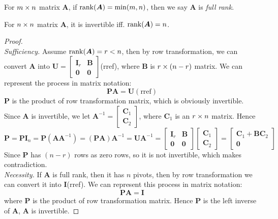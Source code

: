 \begin{definition}
For $m\times n$ matrix $\bm A$, if $\operatorname{rank}(\bm A) = \min(m,n)$, then we say $\bm A$ is \emph{full rank}.
\end{definition}
\begin{theorem}
For $n\times n$ matrix $\bm A$, it is invertible iff. $\operatorname{rank}(\bm A) = n$.
\end{theorem}
\begin{proof}\qquad\\
\textit{Sufficiency.    }Assume $\operatorname{rank}(\bm A)=r<n$, then by row transformation, we can convert $\bm A$ into $\bm U = \begin{bmatrix}
\bm I_{r}&\bm B\\\bm 0&\bm 0
\end{bmatrix}$(rref), where $\bm B$ is $r\times(n-r)$ matrix. We can represent the process in matrix notation:
\[
\bm P\bm A = \bm U(\text{rref})
\]
$\bm P$ is the product of row transformation matrix, which is obviously invertible.\\
Since $\bm A$ is invertible, we let $\bm A^{-1} = \begin{bmatrix}
\bm C_{1}\\\bm C_{2}
\end{bmatrix}$, where $\bm C_{1}$ is an $r\times n$ matrix. Hence 
\[
\bm P = \bm P\bm I_{n}=\bm P(\bm A\bm A^{-1}) = (\bm{PA})\bm A^{-1} = \bm U\bm A^{-1} = \begin{bmatrix}
\bm I_{r}&\bm B\\\bm 0&\bm 0
\end{bmatrix}\begin{bmatrix}
\bm C_{1}\\\bm C_{2}
\end{bmatrix} = \begin{bmatrix}
\bm C_{1}+\bm B\bm C_{2}\\\bm 0
\end{bmatrix}
\]
Since $\bm P$ has $(n-r)$ rows as zero rows, so it is not invertible, which makes contradiction.\\
\textit{Necessity.   }If $\bm A$ is full rank, then it has $n$ pivots, then by row transformation we can convert it into $\bm I$(rref). We can represent this process in matrix notation:
\[
\bm P\bm A = \bm I
\]
where $\bm P$ is the product of row transformation matrix. Hence $\bm P$ is the left inverse of $\bm A$, $\bm A$ is invertible.
\end{proof}
